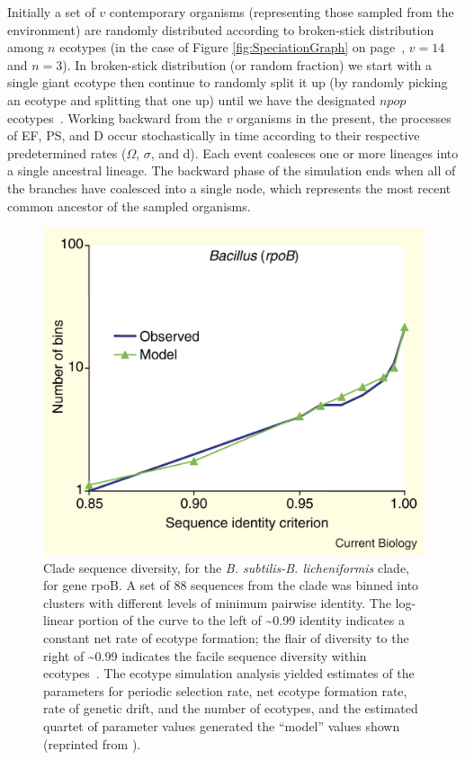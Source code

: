 Initially a set of $v$ contemporary organisms (representing those sampled from the environment) are randomly distributed according to broken-stick distribution among $n$ ecotypes (in the case of Figure \ref{fig:SpeciationGraph} on page~\pageref{fig:SpeciationGraph}, $v = 14$ and $n = 3$).
In broken-stick distribution (or random fraction) we start with a single giant ecotype then continue to randomly split it up (by randomly picking an ecotype and splitting that one up) until we have the designated $npop$ ecotypes~\cite{tokeshi1990niche}.
Working backward from the $v$ organisms in the present, the processes of EF, PS, and D occur stochastically in time according to their respective predetermined rates ($\Omega$, $\sigma$, and d).
Each event coalesces one or more lineages into  a single ancestral lineage.
The backward phase of the simulation ends when all of the branches have coalesced into a single node, which represents the most recent common ancestor of the sampled organisms.

\begin{figure}[h!]
\centering
\includegraphics[scale=1.5]{images/TreeCompare-CH2}
\caption[Observed and simulated evolutionary histories.]{Clade sequence diversity, for the \emph{B. subtilis-B. licheniformis} clade, for gene rpoB. A set of 88 sequences from the clade was binned into clusters with different levels of minimum pairwise identity. The log-linear portion of the curve to the left of \textasciitilde0.99 identity indicates a constant net rate of ecotype formation; the flair of diversity to the right of \textasciitilde0.99 indicates the facile sequence diversity within ecotypes~\cite{acinas2004fine}. The ecotype simulation analysis yielded estimates of the parameters for periodic selection rate, net ecotype formation rate, rate of genetic drift, and the number of ecotypes, and the estimated quartet of parameter values generated the ``model'' values shown~\cite{koeppel2008identifying} (reprinted from \protect\cite{cohan2007systematics}).}
\label{fig:TreeCompare}
\end{figure}

